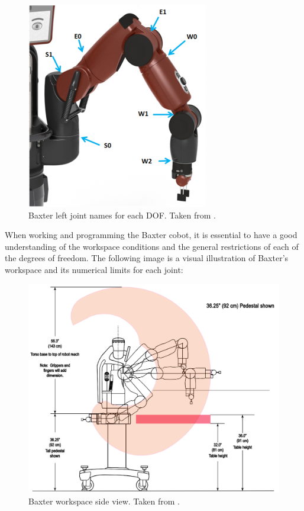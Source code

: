 \documentclass[11pt]{report} %
\begin{document}
\begin{figure}[H]
    \centering
    \includegraphics[width=0.4\linewidth]{assets/imgs/reference_framework/baxter_joint_names.png}
    \caption{Baxter left joint names for each DOF. Taken from \citep{cite_baxter_joint_names_from_sdk_wiki}.} 
    \label{fig_baxter_joint_names}
\end{figure}

When working and programming the Baxter cobot, it is essential to have a good understanding of the workspace conditions and the general restrictions of each of the degrees of freedom. The following image is a visual illustration of Baxter's workspace and its numerical limits for each joint:

\begin{figure}[H]
    \centering
    \includegraphics[width=0.65\linewidth]{assets/imgs/reference_framework/baxter_workspace_side_view.png}
    \caption{Baxter workspace side view. Taken from \citep{cite_baxter_workspace_from_sdk_wiki}.} 
    \label{fig_baxter_workspace_1}
\end{figure}
\end{document}
